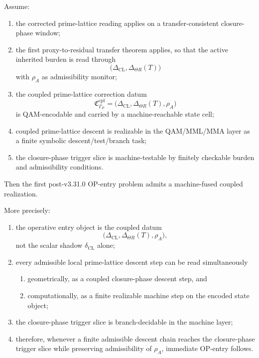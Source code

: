 \begin{theorem}
\label{thm:first-machine-fused-coupled-op-entry}
Assume:
\begin{enumerate}
    \item the corrected prime-lattice reading applies on a transfer-consistent closure-phase window;
    \item the first proxy-to-residual transfer theorem applies, so that the active inherited burden is read through
    \[
      \bigl(\Delta_{\mathrm{CL}},\Delta_{\Theta R}(T)\bigr)
    \]
    with $\rho_A$ as admissibility monitor;
    \item the coupled prime-lattice correction datum
    \[
      \mathfrak{C}_{\Gamma_P}^{\mathrm{cpl}}
      =
      \bigl(\Delta_{\mathrm{CL}},\Delta_{\Theta R}(T),\rho_A\bigr)
    \]
    is QAM-encodable and carried by a machine-reachable state cell;
    \item coupled prime-lattice descent is realizable in the QAM/MML/MMA layer as a finite symbolic descent/test/branch task;
    \item the closure-phase trigger slice is machine-testable by finitely checkable burden and admissibility conditions.
\end{enumerate}
Then the first post-v3.31.0 OP-entry problem admits a machine-fused coupled realization.

More precisely:
\begin{enumerate}
    \item the operative entry object is the coupled datum
    \[
      \bigl(\Delta_{\mathrm{CL}},\Delta_{\Theta R}(T),\rho_A\bigr),
    \]
    not the scalar shadow $\delta_{\mathrm{CL}}$ alone;
    \item every admissible local prime-lattice descent step can be read simultaneously
    \begin{enumerate}
        \item geometrically, as a coupled closure-phase descent step, and
        \item computationally, as a finite realizable machine step on the encoded state object;
    \end{enumerate}
    \item the closure-phase trigger slice is branch-decidable in the machine layer;
    \item therefore, whenever a finite admissible descent chain reaches the closure-phase trigger slice while preserving admissibility of $\rho_A$, immediate OP-entry follows.
\end{enumerate}
\end{theorem}

